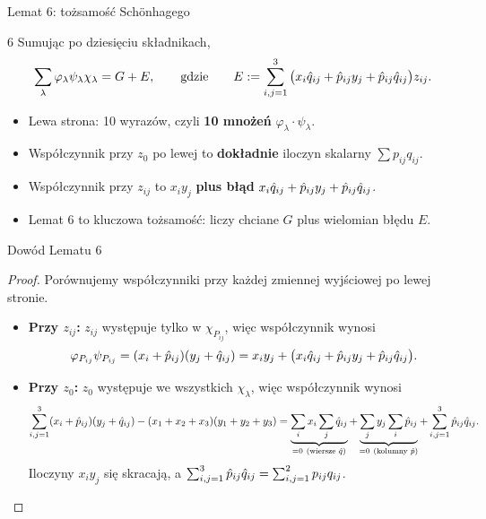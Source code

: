 \begin{frame}{Lemat 6: tożsamość Schönhagego}
  \begin{lemat}{6}
    Sumując po dziesięciu składnikach,
    \[
      \sum_\lambda\varphi_\lambda\psi_\lambda\chi_\lambda=G+E,
      \qquad\text{gdzie}\qquad
      E:=\sum_{i,j=1}^{3}\big(x_i\hat q_{ij}+\hat p_{ij}y_j+\hat p_{ij}\hat q_{ij}\big)z_{ij}.
    \]
  \end{lemat}
  \pause
  \begin{itemize}
    \item Lewa strona: 10 wyrazów, czyli \textbf{10 mnożeń} $\varphi_\lambda\cdot\psi_\lambda$.
    \item Współczynnik przy $z_0$ po lewej to \textbf{dokładnie} iloczyn skalarny $\sum p_{ij}q_{ij}$.
    \item Współczynnik przy $z_{ij}$ to $x_iy_j$ \textbf{plus błąd} $x_i\hat q_{ij}+\hat p_{ij}y_j+\hat p_{ij}\hat q_{ij}$.
    \item<3-> Lemat 6 to kluczowa tożsamość: liczy chciane $G$ plus wielomian błędu $E$.
  \end{itemize}
\end{frame}

\begin{frame}{Dowód Lematu 6}
  \begin{proof}
    Porównujemy współczynniki przy każdej zmiennej wyjściowej po lewej stronie.
    \begin{itemize}
      \item<2-> \textbf{Przy $z_{ij}$:} $z_{ij}$ występuje tylko w $\chi_{P_{ij}}$, więc współczynnik wynosi
        \[\varphi_{P_{ij}}\psi_{P_{ij}}=(x_i+\hat p_{ij})(y_j+\hat q_{ij})
          =x_iy_j+\big(x_i\hat q_{ij}+\hat p_{ij}y_j+\hat p_{ij}\hat q_{ij}\big).\]
      \item<3-> \textbf{Przy $z_0$:} $z_0$ występuje we wszystkich $\chi_\lambda$, więc współczynnik wynosi
        \[
          \sum_{i,j=1}^{3}(x_i+\hat p_{ij})(y_j+\hat q_{ij})-(x_1+x_2+x_3)(y_1+y_2+y_3)
          =\underbrace{\sum_{i}x_i\sum_{j}\hat q_{ij}}_{=0\ (\text{wiersze }\hat q)}
           +\underbrace{\sum_{j}y_j\sum_{i}\hat p_{ij}}_{=0\ (\text{kolumny }\hat p)}
           +\sum_{i,j=1}^{3}\hat p_{ij}\hat q_{ij}.
        \]
        Iloczyny $x_iy_j$ się skracają, a $\sum_{i,j=1}^{3}\hat p_{ij}\hat q_{ij}=\sum_{i,j=1}^{2}p_{ij}q_{ij}$. \qedhere
    \end{itemize}
  \end{proof}
\end{frame}

